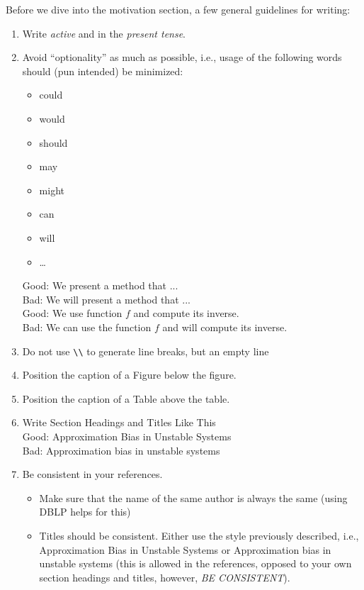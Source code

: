 {Before we dive into the motivation section, a few general guidelines for writing:
\begin{enumerate}
	\item Write \emph{active} and in the \emph{present tense}.
	\item Avoid \enquote{optionality} as much as possible, i.e., usage of the following words should (pun intended) be minimized:
	      \begin{itemize}
		      \item could
		      \item would
		      \item should
		      \item may
		      \item might
		      \item can
		      \item will
		      \item \dots
	      \end{itemize}
	      Good: We present a method that ...\\
	      Bad: We will present a method that ...\\
	      Good: We use function $f$ and compute its inverse.\\
	      Bad: We can use the function $f$ and will compute its inverse.
	\item Do not use \verb|\\| to generate line breaks, but an empty line %
	\item Position the caption of a Figure below the figure.
	\item Position the caption of a Table above the table.
	\item Write Section Headings and Titles Like This\\
	      Good: Approximation Bias in Unstable Systems\\
	      Bad: Approximation bias in unstable systems
	\item Be consistent in your references.
	      \begin{itemize}
		      \item Make sure that the name of the same author is always the same (using DBLP helps for this)
		      \item Titles should be consistent. Either use the style previously described, i.e., Approximation Bias in Unstable Systems or Approximation bias in unstable systems (this is allowed in the references, opposed to your own section headings and titles, however, \emph{BE CONSISTENT}).
	      \end{itemize}
\end{enumerate}

}

